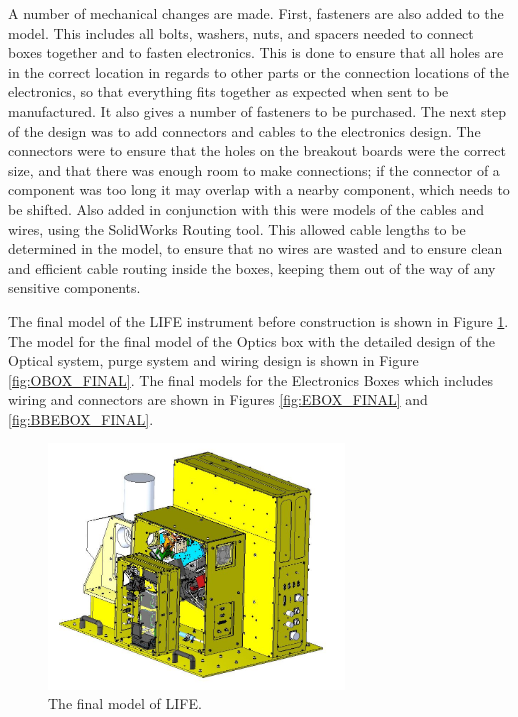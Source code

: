 A number of mechanical changes are made. First, fasteners are also added to the model. This includes all bolts, washers, nuts, and spacers needed to connect boxes together and to fasten electronics. This is done to ensure that all holes are in the correct location in regards to other parts or the connection locations of the electronics, so that everything fits together as expected when sent to be manufactured. It also gives a number of fasteners to be purchased. The next step of the design was to add connectors and cables to the electronics design. The connectors were to ensure that the holes on the breakout boards were the correct size, and that there was enough room to make connections; if the connector of a component was too long it may overlap with a nearby component, which needs to be shifted. Also added in conjunction with this were models of the cables and wires, using the SolidWorks Routing tool. This allowed cable lengths to be determined in the model, to ensure that no wires are wasted and to ensure clean and efficient cable routing inside the boxes, keeping them out of the way of any sensitive components.

The final model of the LIFE instrument before construction is shown in Figure \ref{fig:LIFE_V5_final}. The model for the final model of the Optics box with the detailed design of the Optical system, purge system and wiring design is shown in Figure \ref{fig:OBOX_FINAL}. The final models for the Electronics Boxes which includes wiring and connectors are shown in Figures \ref{fig:EBOX_FINAL} and \ref{fig:BBEBOX_FINAL}.

\begin{figure}
    \centering
    \includegraphics[width=0.7\textwidth]{chap3_images/LIFE_V5_final_images/LIFE_V5_final_img.JPG}
    \caption{The final model of LIFE.}
    \label{fig:LIFE_V5_final}
\end{figure}

